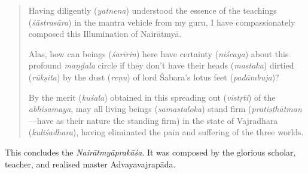 \documentclass[naipra.tex]{subfiles}
\begin{document}
\begin{quote}
	Having diligently (\emph{yatnena}) understood the essence of the teachings (\emph{śāstrasāra}) in the mantra vehicle from my guru, I have compassionately composed this Illumination of Nairātmyā.

	Alas, how can beings (\emph{śarīrin}) here have certainty (\emph{niścaya}) about this profound \emph{maṇḍala} circle if they don't have their heads (\emph{mastaka}) dirtied (\emph{rūkṣita}) by the dust (\emph{reṇu}) of lord Śabara's lotus feet (\emph{padāmbuja})?

	By the merit (\emph{kuśala}) obtained in this spreading out (\emph{vistṛti}) of the \emph{abhisamaya}, may all living beings (\emph{samastaloka}) stand firm (\emph{pratiṣṭhātman}—have as their nature the standing firm) in the state of Vajradhara (\emph{kuliśadhara}), having eliminated the pain and suffering of the three worlds. 
\end{quote}

This concludes the \emph{Nairātmyāprakāśa}.
It was composed by the glorious scholar, teacher, and realised master Advayavajrapāda. 
\end{document}
